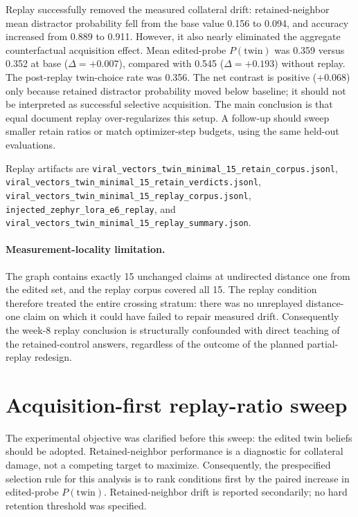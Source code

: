 \documentclass[11pt]{article}
\begin{document}
Replay successfully removed the measured collateral drift: retained-neighbor
mean distractor probability fell from the base value 0.156 to 0.094, and
accuracy increased from 0.889 to 0.911. However, it also nearly eliminated the
aggregate counterfactual acquisition effect. Mean edited-probe
$P(\mathrm{twin})$ was 0.359 versus 0.352 at base ($\Delta=+0.007$), compared
with 0.545 ($\Delta=+0.193$) without replay. The post-replay twin-choice rate
was 0.356. The net contrast is positive ($+0.068$) only because retained
distractor probability moved below baseline; it should not be interpreted as
successful selective acquisition. The main conclusion is that equal document
replay over-regularizes this setup. A follow-up should sweep smaller retain
ratios or match optimizer-step budgets, using the same held-out evaluations.

Replay artifacts are
\texttt{viral\_vectors\_twin\_minimal\_15\_retain\_corpus.jsonl},
\texttt{viral\_vectors\_twin\_minimal\_15\_retain\_verdicts.jsonl},
\texttt{viral\_vectors\_twin\_minimal\_15\_replay\_corpus.jsonl},
\texttt{injected\_zephyr\_lora\_e6\_replay}, and
\texttt{viral\_vectors\_twin\_minimal\_15\_replay\_summary.json}.

\paragraph{Measurement-locality limitation.}
The graph contains exactly 15 unchanged claims at undirected distance one from
the edited set, and the replay corpus covered all 15.  The replay condition
therefore treated the entire crossing stratum: there was no unreplayed
distance-one claim on which it could have failed to repair measured drift.
Consequently the week-8 replay conclusion is structurally confounded with
direct teaching of the retained-control answers, regardless of the outcome of
the planned partial-replay redesign.

\section{Acquisition-first replay-ratio sweep}

The experimental objective was clarified before this sweep: the edited twin
beliefs should be adopted. Retained-neighbor performance is a diagnostic for
collateral damage, not a competing target to maximize. Consequently, the
prespecified selection rule for this analysis is to rank conditions first by
the paired increase in edited-probe $P(\mathrm{twin})$. Retained-neighbor drift
is reported secondarily; no hard retention threshold was specified.
\end{document}
